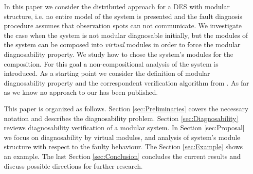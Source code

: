 \documentclass[a4paper, 10pt, conference]{ieeeconf} \IEEEoverridecommandlockouts
\begin{document}
In this paper we consider the distributed approach for a DES with modular
structure, i.e. no entire model of the system is presented and the fault
diagnosis procedure assumes that observation spots can not communicate. We
investigate the case when the system is not modular diagnosable initially, but
the modules of the system can be composed into \emph{virtual} modules in order
to force the modular diagnosability property. We study how to chose the system's
modules for the composition. For this goal a non-compositional analysis of the
system is introduced.
As a starting point we consider the definition of modular diagnosability
property and the correspondent verification algorithm from
\cite{contant_diagnosability_2006}. As far as we know no approach to our has
been published.

This paper is organized as follows. Section \ref{sec:Preliminaries} covers the
necessary notation and describes the diagnosability problem. Section
\ref{sec:Diagnosability} reviews diagnosability verification of a modular
system. In Section \ref{sec:Proposal} we focus on diagnosability by virtual
modules, and analysis of system's module structure with respect to the faulty
behaviour. The Section \ref{sec:Example} shows an example. The last Section
\ref{sec:Conclusion} concludes the current results and discuss possible
directions for further research.
\end{document}
